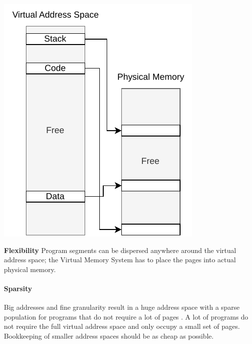 \begin{marginfigure}
    \includegraphics*[width=0.9\marginparwidth]{figures/fund_flexibility.pdf}
    \caption{\textbf{Flexibility} Program segments can be dispersed anywhere
        around the virtual address space; the Virtual Memory System has to place
        the pages into actual physical memory.}
\end{marginfigure}

\paragraph{Sparsity} Big addresses and fine granularity result in a huge address
space with a sparse population for programs that do not require a lot of pages
\cite{tanenbaumOS}.
A lot of programs do not require the full virtual address space and only occupy a small set of pages.
Bookkeeping of smaller address spaces should be as cheap as possible.

